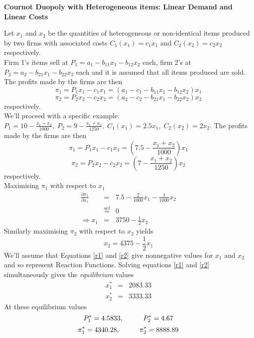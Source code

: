 \documentclass[12pt]{article}
\begin{document}
\begin{center}
\textbf{Cournot Duopoly with Heterogeneous items: Linear Demand and Linear Costs %
}
\end{center}
Let $x_1$ and $x_2$ be the quantities of heterogeneous or non-identical items produced by two firms with associated costs $C_1(x_1) = c_1x_1$ and $C_2(x_2)= c_2x_2$ respectively.\\
Firm 1's items sell at $P_1 = a_1 - b_{11}x_1-b_{12}x_2$ each, firm 2's at $P_2 = a_2 - b_{21}x_1-b_{22}x_2$ each and it is assumed that all items produced are sold. \\ The profits made by the firms are then
$$ \pi_1 = P_1 x_1 - c_1 x_1 = \left(a_1-c_1 - b_{11}x_1 - b_{12}x_2\right)x_1$$
$$ \pi_2 = P_2 x_2 - c_2 x_2 =\left(a_2-c_2 - b_{21}x_1 - b_{22}x_2\right)x_2$$
respectively.\\
We'll proceed with a specific example:
$P_1 = 10 - \frac{x_1 + x_2}{1000}, \; P_2 = 9 - \frac{x_1 + x_2}{1250}, \; C_1(x_1) = 2.5x_1, \; C_2(x_2) = 2x_2$.
The profits made by the firms are then
$$ \pi_1 = P_1 x_1 - c_1 x_1 =  \left(7.5 - \frac{x_1 + x_2}{1000}\right)x_1 $$
$$ \pi_2 = P_2 x_2 - c_2 x_2 = \left(7 - \frac{x_1 + x_2}{1250}\right)x_2 $$
respectively.\\
Maximising $\pi_1$ with respect to $x_1$
\begin{eqnarray}
 \frac{\partial \pi_1} {\partial x_1} &=& 7.5 - \frac{2}{1000}x_1 - \frac{1}{1000}x_2 \nonumber \\
 & \stackrel{set}{=} & 0 \nonumber \\
 \Rightarrow x_1 &=& 3750 - \frac{1}{2} x_2 \label{r1}
 \end{eqnarray}
 Similarly maximising $\pi_2$ with respect to $x_2$ yields
 \begin{equation} x_2 =  4375
 - \frac{1}{2} x_1 \label{r2} \end{equation}
 We'll assume that Equations \ref{r1} and \ref{r2} give nonnegative values for $x_1$ and $x_2$ and so represent Reaction Functions.
 Solving equations \ref{r1} and \ref{r2} simultaneously gives the \textit{equilibrium} values
  \begin{eqnarray*}
   x^*_1 &=& 2083.33 \\
   x^*_2 &=& 3333.33
 \end{eqnarray*}
 At these equilibrium values
 $$ P_1^* = 4.5833, \hspace{10mm} P_2^* = 4.67$$
 $$ \pi^*_1 = 4340.28, \hspace{10mm} \pi^*_2 = 8888.89$$
\end{document}
